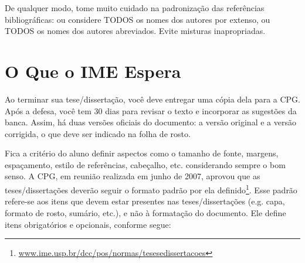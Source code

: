 De qualquer modo, tome muito cuidado na padronização das referências
bibliográficas: ou considere TODOS os nomes dos autores por extenso, ou TODOS
os nomes dos autores abreviados.  Evite misturas inapropriadas.

\section{O Que o IME Espera}

Ao terminar sua tese/dissertação, você deve entregar uma cópia dela para a
CPG. Após a defesa, você tem 30 dias para revisar o texto e incorporar as
sugestões da banca. Assim, há duas versões oficiais do documento: a versão
original e a versão corrigida, o que deve ser indicado na folha de rosto.

Fica a critério do aluno definir aspectos como o tamanho de fonte, margens,
espaçamento, estilo de referências, cabeçalho, etc. considerando sempre o
bom senso. A CPG, em reunião realizada em junho de 2007, aprovou que as
teses/dissertações deverão seguir o formato padrão por ela
definido\footnote{\url{www.ime.usp.br/dcc/pos/normas/tesesedissertacoes}}.
Esse padrão refere-se aos itens que devem estar presentes nas teses/dissertações
(e.g. capa, formato de rosto, sumário, etc.), e não à formatação do documento.
Ele define itens obrigatórios e opcionais, conforme segue:

